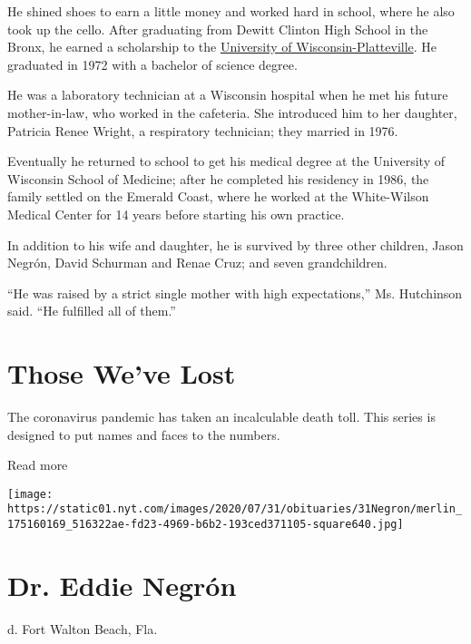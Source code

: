He shined shoes to earn a little money and worked hard in school, where
he also took up the cello. After graduating from Dewitt Clinton High
School in the Bronx, he earned a scholarship to the
\href{https://www.uwplatt.edu/}{University of Wisconsin-Platteville}. He
graduated in 1972 with a bachelor of science degree.

He was a laboratory technician at a Wisconsin hospital when he met his
future mother-in-law, who worked in the cafeteria. She introduced him to
her daughter, Patricia Renee Wright, a respiratory technician; they
married in 1976.

Eventually he returned to school to get his medical degree at the
University of Wisconsin School of Medicine; after he completed his
residency in 1986, the family settled on the Emerald Coast, where he
worked at the White-Wilson Medical Center for 14 years before starting
his own practice.

In addition to his wife and daughter, he is survived by three other
children, Jason Negrón, David Schurman and Renae Cruz; and seven
grandchildren.

``He was raised by a strict single mother with high expectations,'' Ms.
Hutchinson said. ``He fulfilled all of them.''

\href{https://www.nytimes.com/interactive/2020/obituaries/people-died-coronavirus-obituaries.html?action=click\&pgtype=Article\&state=default\&region=BELOW_MAIN_CONTENT\&context=covid_obits_promo}{}

\hypertarget{those-weve-lost}{%
\section{Those We've Lost}\label{those-weve-lost}}

The coronavirus pandemic has taken an incalculable death toll. This
series is designed to put names and faces to the numbers.

Read more

\texttt{[image: https://static01.nyt.com/images/2020/07/31/obituaries/31Negron/merlin\_175160169\_516322ae-fd23-4969-b6b2-193ced371105-square640.jpg]}

\hypertarget{dr-eddie-negruxf3n}{%
\section{Dr. Eddie Negrón}\label{dr-eddie-negruxf3n}}

d. Fort Walton Beach, Fla.

